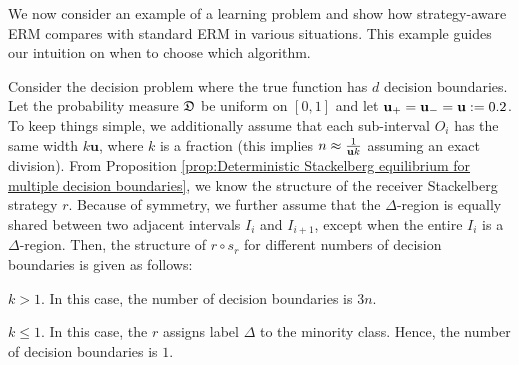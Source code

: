We now consider an example of a learning problem and show how strategy-aware ERM compares with standard ERM in various situations. This example guides our intuition on when to choose which algorithm.

\begin{exg}\label{eg:Multiple decision boundaries}
    Consider the decision problem where the true function has $d$ decision boundaries. Let the probability measure $\mathfrak{D}$ be uniform on $[0,1]$ and let $\mathbf{u_+} = \mathbf{u_-} = \mathbf{u} := 0.2$. To keep things simple, we additionally assume that each sub-interval $O_i$ has the same width $k\mathbf{u}$, where $k$ is a fraction (this implies $n \approx \frac{1}{\mathbf{u} k}$ assuming an exact division). From Proposition \ref{prop:Deterministic Stackelberg equilibrium for multiple decision boundaries}, we know the structure of the receiver Stackelberg strategy $r$. Because of symmetry, we further assume that the $\Delta$-region is equally shared between two adjacent intervals $I_i$ and $I_{i+1}$, except when the entire $I_i$ is a $\Delta$-region. Then, the structure of $r \circ s_r$ for different numbers of decision boundaries is given as follows:
    \begin{case} $k > 1$. In this case, the number of decision boundaries is $3n$.
    \end{case}

    \begin{case}$k \leq 1$. In this case, the $r$ assigns label $\Delta$ to the minority class. Hence, the number of decision boundaries is $1$.
    \end{case}
	
\end{exg}



